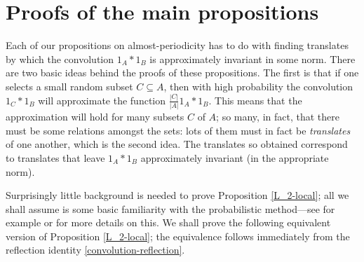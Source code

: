 \documentclass[12pt,a4paper,reqno]{amsart}
\numberwithin{equation}{section}
\theoremstyle{plain}
\theoremstyle{definition}
\renewcommand{\subset}{\subseteq}
\begin{document}
\section{Proofs of the main propositions}\label{main_proofs}
Each of our propositions on almost-periodicity has to do with finding translates by which the convolution $1_A*1_B$ is approximately invariant in some norm. There are two basic ideas behind the proofs of these propositions. The first is that if one selects a small random subset $C \subset A$, then with high probability the convolution $1_C*1_B$ will approximate the function $\frac{|C|}{|A|}1_A*1_B$. This means that the approximation will hold for many subsets $C$ of $A$; so many, in fact, that there must be some relations amongst the sets: lots of them must in fact be \emph{translates} of one another, which is the second idea. The translates so obtained correspond to translates that leave $1_A*1_B$ approximately invariant (in the appropriate norm).

Surprisingly little background is needed to prove Proposition \ref{L_2-local}; all we shall assume is some basic familiarity with the probabilistic method---see for example \cite{alon-spencer} or \cite{tao-vu} for more details on this. We shall prove the following equivalent version of Proposition \ref{L_2-local}; the equivalence follows immediately from the reflection identity \eqref{convolution-reflection}.
\end{document}
